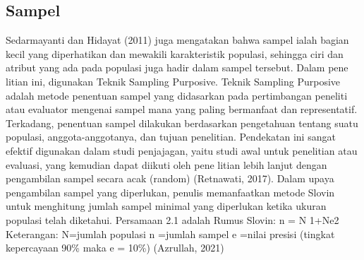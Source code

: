 \subsection{Sampel}
Sedarmayanti dan Hidayat (2011) juga mengatakan bahwa sampel ialah bagian kecil yang diperhatikan dan mewakili karakteristik populasi, sehingga ciri dan atribut yang ada pada populasi juga hadir dalam sampel tersebut. Dalam pene litian ini, digunakan Teknik Sampling Purposive. Teknik Sampling Purposive adalah metode penentuan sampel yang didasarkan pada pertimbangan peneliti atau evaluator mengenai sampel mana yang paling bermanfaat dan representatif. Terkadang, penentuan sampel dilakukan berdasarkan pengetahuan tentang suatu populasi, anggota-anggotanya, dan tujuan penelitian. Pendekatan ini sangat efektif digunakan dalam studi penjajagan, yaitu studi awal untuk penelitian atau evaluasi, yang kemudian dapat diikuti oleh pene litian lebih lanjut dengan pengambilan sampel secara acak (random) (Retnawati, 2017). Dalam upaya pengambilan sampel yang diperlukan, penulis memanfaatkan metode Slovin untuk menghitung jumlah sampel minimal yang diperlukan ketika ukuran populasi telah diketahui. Persamaan 2.1 adalah Rumus Slovin: n = N 1+Ne2 Keterangan: N=jumlah populasi n =jumlah sampel e =nilai presisi (tingkat kepercayaan 90\% maka e = 10\%) (Azrullah, 2021)
